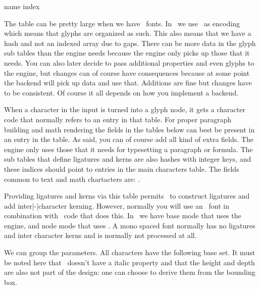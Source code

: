 
\starttabulate[|l|c|]
\FL
\BC name                 \BC index \NC \NR
\ML
\NC {}         \NC \NR
\NC {}         \NC \NR
\NC {}  \NC \NR
\NC {}   \NC \NR
\NC {}       \NC \NR
\NC {}          \NC \NR
\NC {}    \NC \NR
\LL
\stoptabulate

The  table can be pretty large when we have \OPENTYPE\ fonts.
In \CONTEXT\ we use \UNICODE\ as encoding which means that glyphs are organized
as such. This also means that we have a hash and not an indexed array due to
gaps. There can be more data in the glyph sub tables than the engine needs
because the engine only picks up those that it needs. You can also later decide
to pass additional properties and even glyphs to the engine, but changes can of
course have consequences because at some point the backend will pick up data and
use that. Additions are fine but changes have to be consistent. Of course it all
depends on how you implement a backend.

When a character in the input is turned into a glyph node, it gets a character
code that normally refers to an entry in that table. For proper paragraph
building and math rendering the fields in the tables below can best be present in
an entry in the  table. As said, you can of course add all kind
of extra fields. The engine only uses those that it needs for typesetting a
paragraph or formula. The sub tables that define ligatures and kerns are also
hashes with integer keys, and these indices should point to entries in the main
characters table. The fields common to text and math chartacters are:
.

Providing ligatures and kerns via this table permits \TEX\ to construct ligatures
and add inter|-|character kerning. However, normally you will use an \OPENTYPE\
font in combination with \LUA\ code that does this. In \CONTEXT\ we have base
mode that uses the engine, and node mode that uses \LUA. A mono spaced font
normally has no ligatures and inter character kerns and is normally not processed
at all.

We can group the parameters. All characters have the following base set. It must
be noted here that \OPENTYPE\ doesn't have a italic property and that the height
and depth are also not part of the design: one can choose to derive them from the
bounding box.

